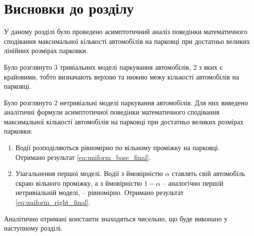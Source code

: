 \section{Висновки до розділу}
У даному розділі було проведено асимптотичний аналіз поведінки математичного сподівання максимальної кількості автомобілів на парковці при достатньо великих лінійних розмірах парковки.

Було розглянуто 3 тривіальних моделі паркування автомобілів, 2 з яких є крайовими, тобто визначають верхню та нижню межу кількості автомобілів на парковці.

Було розглянуто 2 нетривіальні моделі паркування автомобілів. Для них виведено аналітичні формули асимптотичної поведінки математичного сподівання максимальної кількості автомобілів на парковці при достатньо великих розмірах парковки:
\begin{enumerate}
\item Водії розподіляються рівномірно по вільному проміжку на парковці. Отримано результат \eqref{eq:uniform_base_final}.
\item Узагальнення першої моделі. Водії з ймовірністю $\alpha$ ставлять свій автомобіль скраю вільного проміжку, а з ймовірністю $1 - \alpha$ – аналогічно першій нетривіальній моделі, – рівномірно. Отримано результат \eqref{eq:uniform_right_final}.
\end{enumerate}

Аналітично отримані константи знаходяться чисельно, що буде виконано у наступному розділі.